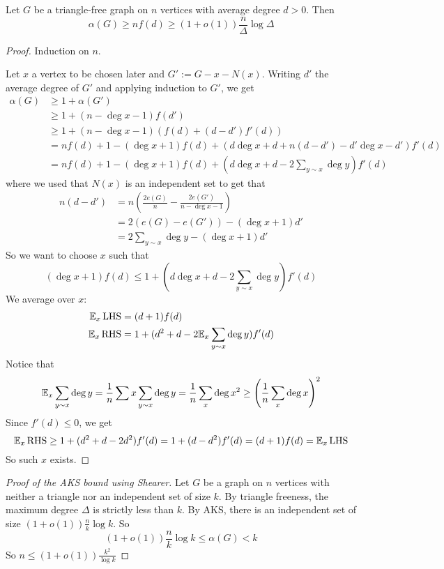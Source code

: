 \documentclass{article}
\begin{document}
\begin{thm}[Shearer]
  Let $G$ be a triangle-free graph on $n$ vertices with average degree $d > 0$.
  Then
  $$\alpha(G) \ge nf(d) \ge (1 + o(1)) \frac n\Delta \log\Delta$$
\end{thm}
\begin{proof}
  Induction on $n$.

  Let $x$ a vertex to be chosen later and $G' := G - x - N(x)$. Writing $d'$ the average degree of $G'$ and applying induction to $G'$, we get
  \begin{align*}
    \alpha(G)
    & \ge 1 + \alpha(G') \\
    & \ge 1 + (n - \deg x - 1)f(d') \\
    & \ge 1 + (n - \deg x - 1)(f(d) + (d - d')f'(d)) \\
    & = nf(d) + 1 - (\deg x + 1)f(d) + (d\deg x + d + n(d - d') - d'\deg x - d')f'(d) \\
    & = nf(d) + 1 - (\deg x + 1)f(d) + \left(d\deg x + d - 2\sum_{y \sim x} \deg y\right)f'(d)
  \end{align*}
  where we used that $N(x)$ is an independent set to get that
  \begin{align*}
    n(d - d')
    & = n \left(\frac{2e(G)}n - \frac{2e(G')}{n - \deg x - 1}\right) \\
    & = 2(e(G) - e(G')) - (\deg x + 1)d' \\
    & = 2\sum_{y \sim x} \deg y - (\deg x + 1)d'
  \end{align*}
  So we want to choose $x$ such that
  $$(\deg x + 1)f(d) \le 1 + (d\deg x + d - 2\sum_{y \sim x} \deg y)f'(d)$$
  We average over $x$:
  \begin{align*}
    \mathbb E_x \operatorname{LHS} & = (d + 1)f(d) \\
    \mathbb E_x \operatorname{RHS} & = 1 + (d^2 + d - 2\mathbb E_x\sum_{y \sim x} \deg y)f'(d)
  \end{align*}
  Notice that
  $$\mathbb E_x\sum_{y \sim x} \deg y = \frac 1n \sum x\sum_{y \sim x} \deg y = \frac 1n \sum_x \deg x^2 \ge \left(\frac 1n\sum_x \deg x\right)^2$$
  Since $f'(d) \le 0$, we get
  $$\mathbb E_x \operatorname{RHS} \ge 1 + (d^2 + d - 2d^2)f'(d) = 1 + (d - d^2)f'(d) = (d + 1)f(d) = \mathbb E_x \operatorname{LHS}$$
  So such $x$ exists.
\end{proof}

\begin{proof}[Proof of the AKS bound using Shearer]
  Let $G$ be a graph on $n$ vertices with neither a triangle nor an independent set of size $k$. By triangle freeness, the maximum degree $\Delta$ is strictly less than $k$. By AKS, there is an independent set of size $(1 + o(1))\frac nk \log k$. So
  $$(1 + o(1))\frac nk \log k \le \alpha(G) < k$$
  So $n \le (1 + o(1)) \frac{k^2}{\log k}$
\end{proof}

\newlec

\printindex
\end{document}
